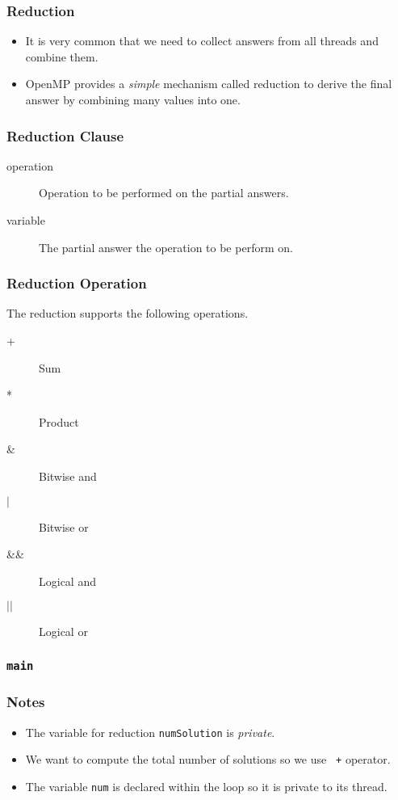 \documentclass{beamer}
\begin{document}
\begin{frame}
\frametitle{Reduction}
\begin{itemize}
\item It is very common that we need to collect answers from all
  threads and combine them.
\item OpenMP provides a {\em simple} mechanism called reduction to
  derive the final answer by combining many values into one.
\end{itemize}
\end{frame}


\begin{frame}
  \frametitle{Reduction Clause} 
  \begin{description}
  \item[operation] Operation to be performed on the partial answers.
  \item[variable] The partial answer the operation to be perform
    on.
  \end{description}
\end{frame}

\begin{frame}
  \frametitle{Reduction Operation} 
  The reduction supports the following operations.
  \begin{description}
  \item [+] Sum
  \item [*] Product
  \item [\&] Bitwise and
  \item [$|$] Bitwise or
  \item [\&\&] Logical and
  \item [$||$] Logical or
  \end{description}
\end{frame}


\begin{frame}
\frametitle{\tt main}
\end{frame}

\begin{frame}
\frametitle{Notes}
\begin{itemize}
\item The variable for reduction {\tt numSolution} is {\em private}.
\item We want to compute the total number of solutions so we use {\tt
  +} operator.
\item The variable {\tt num} is declared within the loop so it is
  private to its thread.
\end{itemize}
\end{frame}
\end{document}
